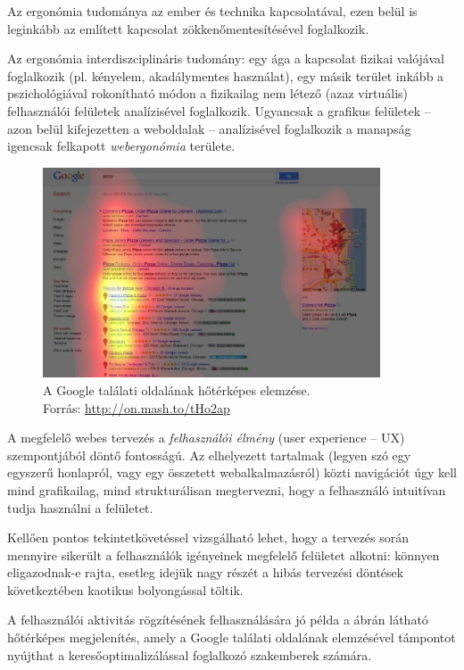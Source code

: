 Az ergonómia tudománya az ember és technika kapcsolatával, ezen belül is leginkább az említett kapcsolat zökkenőmentesítésével foglalkozik. 

Az ergonómia interdiszciplináris tudomány: egy ága a kapcsolat fizikai valójával foglalkozik (pl. kényelem, akadálymentes használat), egy másik terület inkább a pszichológiával rokonítható módon a fizikailag nem létező (azaz virtuális) felhasználói felületek analízisével foglalkozik. Ugyancsak a grafikus felületek -- azon belül kifejezetten a weboldalak -- analízisével foglalkozik a manapság igencsak felkapott \emph{webergonómia} területe.

\begin{figure}[!ht]
\centering
\includegraphics[width=100mm, keepaspectratio]{figures/google_heatmap.png}
\caption{A Google találati oldalának hőtérképes elemzése.\\Forrás: \url{http://on.mash.to/tHo2ap}}
\label{fig:google_heatmap}
\end{figure}

A megfelelő webes tervezés a \emph{felhasználói élmény} (user experience -- UX) szempontjából döntő fontosságú. Az elhelyezett tartalmak (legyen szó egy egyszerű honlapról, vagy egy összetett webalkalmazásról) közti navigációt úgy kell mind grafikailag, mind strukturálisan megtervezni, hogy a felhasználó intuitívan tudja használni a felületet.

Kellően pontos tekintetkövetéssel vizsgálható lehet, hogy a tervezés során mennyire sikerült a felhasználók igényeinek megfelelő felületet alkotni: könnyen eligazodnak-e rajta, esetleg idejük nagy részét a hibás tervezési döntések következtében kaotikus bolyongással töltik.

A felhasználói aktivitás rögzítésének felhasználására jó példa a  ábrán látható hőtérképes megjelenítés, amely a Google találati oldalának elemzésével támpontot nyújthat a keresőoptimalizálással foglalkozó szakemberek számára.

